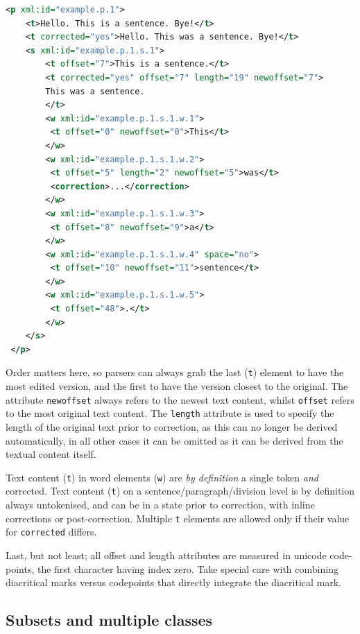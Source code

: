 \documentclass[a4paper,12pt]{report}
\begin{document}
\begin{lstlisting}[language=xml]
 <p xml:id="example.p.1">
    <t>Hello. This is a sentence. Bye!</t>
    <t corrected="yes">Hello. This was a sentence. Bye!</t> 
    <s xml:id="example.p.1.s.1">        
        <t offset="7">This is a sentence.</t>
        <t corrected="yes" offset="7" length="19" newoffset="7">
        This was a sentence.
        </t>        
        <w xml:id="example.p.1.s.1.w.1">
         <t offset="0" newoffset="0">This</t>
        </w>
        <w xml:id="example.p.1.s.1.w.2">
         <t offset="5" length="2" newoffset="5">was</t>
         <correction>...</correction>
        </w>
        <w xml:id="example.p.1.s.1.w.3">
         <t offset="8" newoffset="9">a</t>
        </w>
        <w xml:id="example.p.1.s.1.w.4" space="no">
         <t offset="10" newoffset="11">sentence</t>
        </w>
        <w xml:id="example.p.1.s.1.w.5">
         <t offset="48">.</t>
        </w>
    </s>
 </p>
\end{lstlisting}

    

Order matters here, so parsers can always grab the last (\texttt{t}) element to have the most edited version, and the first to have the version closest to the original. The attribute \texttt{newoffset} always refers to the newest text content, whilst \texttt{offset} refers to the most original text content. The \texttt{length} attribute is used to specify the length of the original text prior to correction, as this can no longer be derived automatically, in all other cases it can be omitted as it can be derived from the textual content itself.

Text content (\texttt{t}) in word elements (\texttt{w}) are \emph{by definition} a single token \emph{and} corrected.  Text content (\texttt{t}) on a sentence/paragraph/division level is by definition always untokenised, and can be in a state prior to correction, with inline corrections or post-correction. Multiple \texttt{t} elements are allowed only if their value for \texttt{corrected} differs.

Last, but not least; all offset and length attributes are measured in unicode code-points, the first character having index zero. Take special care with combining diacritical marks versus codepoints that directly integrate the diacritical mark.

\subsection{Subsets and multiple classes}
\label{subset}
\end{document}
